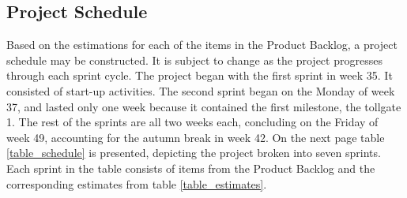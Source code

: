 \subsection{Project Schedule}
Based on the estimations for each of the items in the Product Backlog, a project schedule may be constructed. It is subject to change as the project progresses through each sprint cycle. The project began with the first sprint in week 35. It consisted of start-up activities. The second sprint began on the Monday of week 37, and lasted only one week because it contained the first milestone, the tollgate 1. The rest of the sprints are all two weeks each, concluding on the Friday of week 49, accounting for the autumn break in week 42. On the next page table \ref{table_schedule} is presented, depicting the project broken into seven sprints. Each sprint in the table consists of items from the Product Backlog and the corresponding estimates from table \ref{table_estimates}.
\pagebreak
